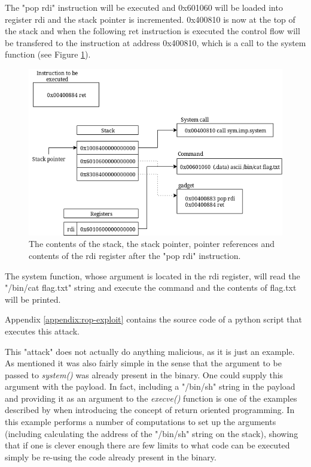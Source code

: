 The "pop rdi" instruction will be executed and 0x601060 will be loaded into register rdi
and the stack pointer is incremented. 0x400810 is now at the top of the stack and when the
following ret instruction is executed the control flow will be transfered to the
instruction at address 0x400810, which is a call to the system function (see Figure
\ref{fig:after-second}).

\begin{figure}[h]
	\centering
	\includegraphics[width=\textwidth]{background/software-diversity/figures/after-second}
	\caption{The contents of the stack, the stack pointer, pointer references and contents of the rdi register after the "pop rdi" instruction.}
	\label{fig:after-second}
\end{figure}

The system function, whose argument is located in the rdi register, will read the
"/bin/cat flag.txt" string and execute the command and the contents of flag.txt will be
printed.

Appendix \ref{appendix:rop-exploit} contains the source code of a python script that
executes this attack.

This "attack" does not actually do anything malicious, as it is just an example. As mentioned
it was also fairly simple in the sense that the argument to be passed to \textit{system()}
was already present in the binary. One could supply this argument with the payload. In
fact, including a "/bin/sh" string in the payload and providing it as an argument to the
\textit{execve()} function is one of the examples described by \textcite{rop} when
introducing the concept of return oriented programming. In this example \textcite{rop}
performs a number of computations to set up the arguments (including calculating the address
of the "/bin/sh" string on the stack), showing that if one is clever enough there are few
limits to what code can be executed simply be re-using the code already present in the binary.

